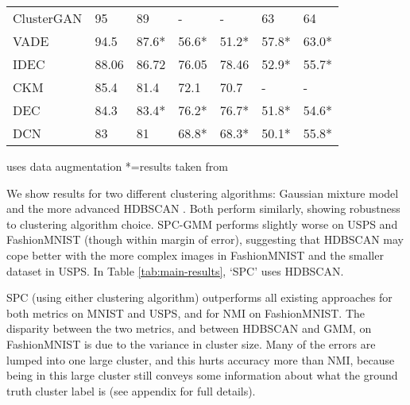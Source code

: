 \documentclass[runningheads]{llncs}
\begin{document}
\begin{table*}[th]
{{\begin{tabular}{@{}lllllll@{}}
    ClusterGAN \cite{Mukherjee2019ClusterGANL}  & 95 & 89 & - & - & 63 & 64\\
    
    VADE \cite{jiang2016variational}  & 94.5 & 87.6* & 56.6* & 51.2* & 57.8* & 63.0*\\
    
    IDEC \cite{guo2017improved}  & 88.06 & 86.72 & 76.05 & 78.46 & 52.9* & 55.7*\\
    
    CKM \cite{gao2020deep}  & 85.4 & 81.4 & 72.1 & 70.7 & - & -\\
    
    DEC \cite{xie2016unsupervised}  & 84.3 & 83.4* & 76.2* & 76.7* & 51.8* & 54.6*\\
    
    DCN \cite{yang2017towards}  & 83 & 81 & 68.8* & 68.3* & 50.1* & 55.8*\\
    
   \bottomrule
  \end{tabular}}}  
  \vspace{1ex}
  \centerline{uses data augmentation \hspace{10pt} *=results taken from \cite{mrabah2019deep}}
  \vspace{1.5ex}
\caption{\footnotesize Accuracy and NMI of SPC compared to other top-performing image clustering models. The best results are in bold, and the second-best are emphasized. We report the mean and standard deviation (in parentheses) for five runs. } \label{tab:main-results}
  \vspace{-4ex}
  \end{table*}

We show results for two different clustering algorithms: Gaussian mixture model and the more advanced HDBSCAN \cite{mcinnes2017hdbscan}. Both perform similarly, showing robustness to clustering algorithm choice. SPC-GMM performs slightly worse on USPS and FashionMNIST (though within margin of error), suggesting that HDBSCAN  may cope better with the more complex images in FashionMNIST and the smaller dataset in USPS. In Table \ref{tab:main-results}, `SPC' uses HDBSCAN.

SPC (using either clustering algorithm) outperforms all existing approaches for both metrics on MNIST and USPS, and for NMI on FashionMNIST. The disparity between the two metrics, and between HDBSCAN and GMM, on FashionMNIST is due to the variance in cluster size. Many of the errors are lumped into one large cluster, and this hurts accuracy more than NMI, because being in this large cluster still conveys some information about what the ground truth cluster label is (see appendix for full details).
\end{document}
